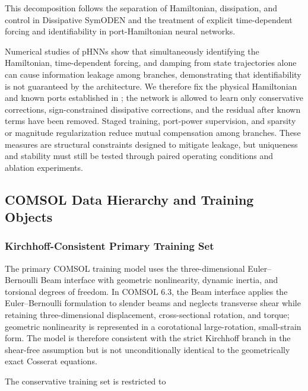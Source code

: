 This decomposition follows the separation of Hamiltonian, dissipation, and control in Dissipative SymODEN and the treatment of explicit time-dependent forcing and identifiability in port-Hamiltonian neural networks.\cite{Zhong2020Dissipative,Desai2021PHNN}

Numerical studies of pHNNs show that simultaneously identifying the Hamiltonian, time-dependent forcing, and damping from state trajectories alone can cause information leakage among branches, demonstrating that identifiability is not guaranteed by the architecture.\cite{Desai2021PHNN} We therefore fix the physical Hamiltonian and known ports established in ; the network is allowed to learn only conservative corrections, sign-constrained dissipative corrections, and the residual after known terms have been removed. Staged training, port-power supervision, and sparsity or magnitude regularization reduce mutual compensation among branches. These measures are structural constraints designed to mitigate leakage, but uniqueness and stability must still be tested through paired operating conditions and ablation experiments.

\subsection{COMSOL Data Hierarchy and Training Objects}\label{sec:chnn-4-4}

\subsubsection{Kirchhoff-Consistent Primary Training Set}\label{sec:chnn-4-4-1}

The primary COMSOL training model uses the three-dimensional Euler--Bernoulli Beam interface with geometric nonlinearity, dynamic inertia, and torsional degrees of freedom. In COMSOL 6.3, the Beam interface applies the Euler--Bernoulli formulation to slender beams and neglects transverse shear while retaining three-dimensional displacement, cross-sectional rotation, and torque; geometric nonlinearity is represented in a corotational large-rotation, small-strain form.\cite{COMSOLBeamInterface2025,COMSOLGeometricNonlinearity2025,COMSOLSectionStiffness2025} The model is therefore consistent with the strict Kirchhoff branch in the shear-free assumption but is not unconditionally identical to the geometrically exact Cosserat equations.

The conservative training set is restricted to


